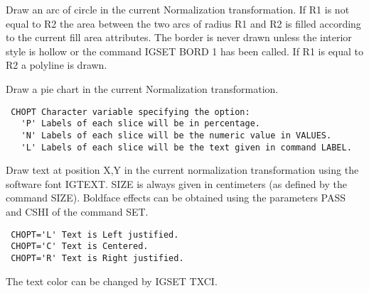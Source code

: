 \BEGARG
{}
\ENDARG
\BEGTEXT
Draw an arc of circle
in the current Normalization transformation.
If R1 is not equal to R2 the area between the
two arcs of radius R1 and R2 is
filled according to the current fill area attributes.
The border is never drawn unless the interior style is hollow or
the command IGSET BORD 1 has been called.
If R1 is equal to R2 a polyline is drawn.
\ENDTEXT

\BEGARG
{}
\ENDARG
\BEGTEXT
Draw a pie chart
in the current Normalization transformation.
\begin{verbatim}
 CHOPT Character variable specifying the option:
   'P' Labels of each slice will be in percentage.
   'N' Labels of each slice will be the numeric value in VALUES.
   'L' Labels of each slice will be the text given in command LABEL.
\end{verbatim}
\ENDTEXT

\BEGARG
{}
\ENDARG
\BEGTEXT
Draw text at position X,Y in the current normalization
transformation using the software font IGTEXT.
SIZE is always given in centimeters (as defined by the command SIZE).
Boldface effects can
be obtained using the parameters PASS and CSHI of the command SET.
\begin{verbatim}
 CHOPT='L' Text is Left justified.
 CHOPT='C' Text is Centered.
 CHOPT='R' Text is Right justified.
\end{verbatim}
The text color can be changed by IGSET TXCI.
\ENDTEXT

